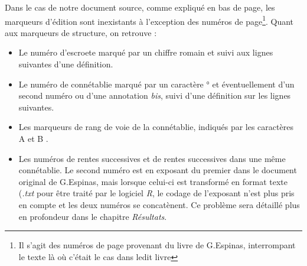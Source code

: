 Dans le cas de notre document source, comme expliqué en bas de page, les marqueurs d'édition sont inexistants à l'exception des numéros de page\footnote{ Il s'agit des numéros de page provenant du livre de G.Espinas, interrompant le texte là où c'était le cas dans ledit livre}. Quant aux marqueurs de structure, on retrouve :
\begin{itemize}
\item Le numéro d'escroete marqué par un chiffre romain et suivi aux lignes suivantes d'une définition.
\item Le numéro de connétablie marqué par un caractère \og ° \fg et éventuellement d'un second numéro ou d'une annotation \textit{bis}, suivi d'une définition sur les lignes suivantes.
\item Les marqueurs de rang de voie de la connétablie, indiqués par les caractères \og A \fg et \og B \fg.
\item Les numéros de rentes successives et de rentes successives dans une même connétablie. Le second numéro est en exposant du premier dans le document original de G.Espinas, mais lorsque celui-ci est transformé en format texte (\textit{.txt} pour être traité par le logiciel \textit{R}, le codage de l'exposant n'est plus pris en compte et les deux numéros se concatènent. Ce problème sera détaillé plus en profondeur dans le chapitre \textit{Résultats}.  
\end{itemize}










